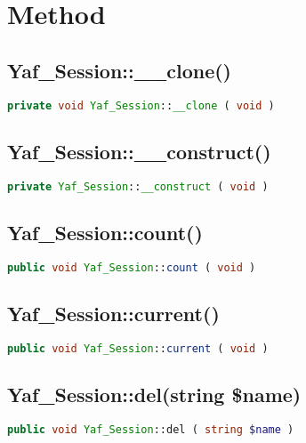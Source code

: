 \section{Method}


\subsection{Yaf\_Session::\_\_clone()}




\begin{lstlisting}[language=PHP]
private void Yaf_Session::__clone ( void )
\end{lstlisting}

\subsection{Yaf\_Session::\_\_construct()}



\begin{lstlisting}[language=PHP]
private Yaf_Session::__construct ( void )
\end{lstlisting}



\subsection{Yaf\_Session::count()}



\begin{lstlisting}[language=PHP]
public void Yaf_Session::count ( void )
\end{lstlisting}


\subsection{Yaf\_Session::current()}


\begin{lstlisting}[language=PHP]
public void Yaf_Session::current ( void )
\end{lstlisting}


\subsection{Yaf\_Session::del(string \$name)}


\begin{lstlisting}[language=PHP]
public void Yaf_Session::del ( string $name )
\end{lstlisting}



